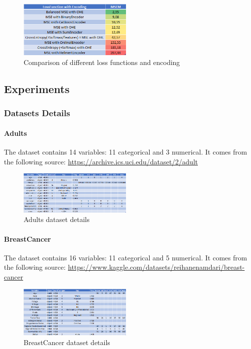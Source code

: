 \documentclass{article}
\theoremstyle{definition}
\begin{document}
\begin{figure}[H]
     \centering
     \includegraphics[width=0.49\textwidth]{imgs/Illu/1000Epochs/Comparison_LF_Enc.png}
     \caption{Comparison of different loss functions and encoding}
\end{figure}



\subsection{Experiments}
\label{Applications_Details}

\subsubsection{Datasets Details}

\paragraph{Adults}
The dataset contains 14 variables: 11 categorical and 3 numerical. It comes from the following source: \url{https://archive.ics.uci.edu/dataset/2/adult}
\begin{figure}[H]
     \centering
     \includegraphics[width=0.49\textwidth]{imgs/Dataset_Details/Adults_Details.png}
     \caption{Adults dataset details}
\end{figure}




\paragraph{BreastCancer}
The dataset contains 16 variables: 11 categorical and 5 numerical. It comes from the following source: \url{https://www.kaggle.com/datasets/reihanenamdari/breast-cancer}
\begin{figure}[H]
     \centering
     \includegraphics[width=0.49\textwidth]{imgs/Dataset_Details/BreastCancer_Details.png}
     \caption{BreastCancer dataset details}
\end{figure}
\end{document}
